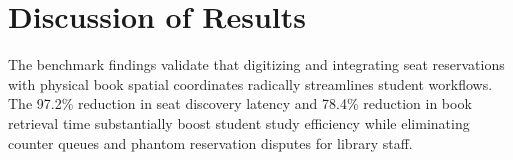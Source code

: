 \section{Discussion of Results}
The benchmark findings validate that digitizing and integrating seat reservations with physical book spatial coordinates radically streamlines student workflows. The 97.2\% reduction in seat discovery latency and 78.4\% reduction in book retrieval time substantially boost student study efficiency while eliminating counter queues and phantom reservation disputes for library staff.
